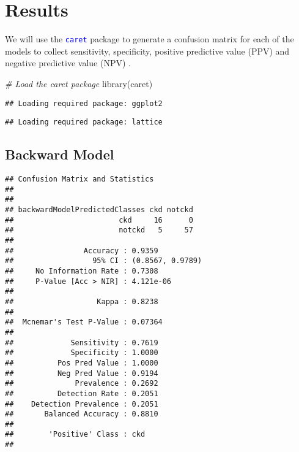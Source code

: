 \documentclass[
]{article}
\newenvironment{Shaded}{\begin{snugshade}}{\end{snugshade}}
\newcommand{\CommentTok}[1]{\textcolor[rgb]{0.56,0.35,0.01}{\textit{#1}}}
\newcommand{\FunctionTok}[1]{\textcolor[rgb]{0.00,0.00,0.00}{#1}}
\newcommand{\NormalTok}[1]{#1}
\newcommand{\SpecialCharTok}[1]{\textcolor[rgb]{0.00,0.00,0.00}{#1}}
\begin{document}
\hypertarget{results}{%
\section{Results}\label{results}}

We will use the \textcolor{blue}{\texttt{caret}} package to generate a
confusion matrix for each of the models to collect sensitivity,
specificity, positive predictive value (PPV) and negative predictive
value (NPV) \autocite{Kuhn2008}.

\begin{Shaded}
\begin{Highlighting}[]
\CommentTok{\# Load the caret package}
\FunctionTok{library}\NormalTok{(caret)}
\end{Highlighting}
\end{Shaded}

\begin{verbatim}
## Loading required package: ggplot2
\end{verbatim}

\begin{verbatim}
## Loading required package: lattice
\end{verbatim}

\hypertarget{backward-model-1}{%
\subsection{Backward Model}\label{backward-model-1}}

\begin{Shaded}
\end{Shaded}

\begin{verbatim}
## Confusion Matrix and Statistics
## 
##                              
## backwardModelPredictedClasses ckd notckd
##                        ckd     16      0
##                        notckd   5     57
##                                           
##                Accuracy : 0.9359          
##                  95% CI : (0.8567, 0.9789)
##     No Information Rate : 0.7308          
##     P-Value [Acc > NIR] : 4.121e-06       
##                                           
##                   Kappa : 0.8238          
##                                           
##  Mcnemar's Test P-Value : 0.07364         
##                                           
##             Sensitivity : 0.7619          
##             Specificity : 1.0000          
##          Pos Pred Value : 1.0000          
##          Neg Pred Value : 0.9194          
##              Prevalence : 0.2692          
##          Detection Rate : 0.2051          
##    Detection Prevalence : 0.2051          
##       Balanced Accuracy : 0.8810          
##                                           
##        'Positive' Class : ckd             
## 
\end{verbatim}
\end{document}
